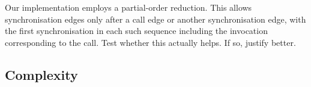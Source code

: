 \framebox{**} Our implementation employs a partial-order reduction.  This
allows synchronisation edges only after a call edge or another synchronisation
edge, with the first synchronisation in each such sequence including the
invocation corresponding to the call.  \framebox{**} Test whether this
actually helps.  If so, justify better.








\subsection{Complexity}
\label{sec:NP-complete}

